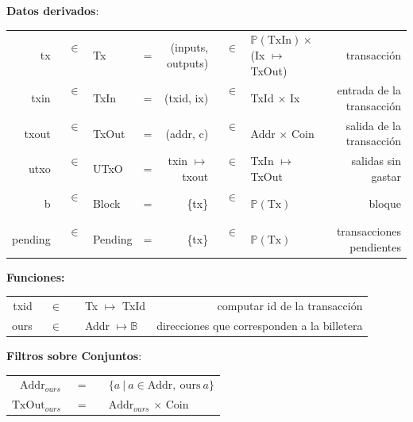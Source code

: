 \documentclass[12pt]{book}
\begin{document}
\textbf{Datos derivados}:

\begin{center}
	\begin{tabular}{ r @{} c @{} l c r @{} c @{} l r}
		tx      & \ $\in$\ \  & Tx      & = & (inputs, outputs)    & \ $\in$\ \  & $\mathbb{P}(\text{TxIn}) \times$ (Ix $\mapsto$ TxOut) & transacción               \\
		txin    & \ $\in$\ \  & TxIn    & = & (txid, ix)           & \ $\in$\ \  & TxId $\times$ Ix                                      & entrada de la transacción \\
		txout   & \ $\in$\ \  & TxOut   & = & (addr, c)            & \ $\in$\ \  & Addr $\times$ Coin                                    & salida de la transacción  \\
		utxo    & \ $\in$\ \  & UTxO    & = & txin $\mapsto$ txout & \ $\in$\ \  & TxIn $\mapsto$ TxOut                                  & salidas sin gastar        \\
        b       & \ $\in$\ \  & Block   & = & \{tx\}                   & \ $\in$\ \  & $\mathbb{P}(\text{Tx})$                               & bloque                    \\
        pending & \ $\in$\ \  & Pending & = & \{tx\}                   & \ $\in$\ \  & $\mathbb{P}(\text{Tx})$                               & transacciones pendientes
	\end{tabular}
\end{center}

\textbf{Funciones:}

\begin{center}
	\begin{tabular}{ r @{} c @{} l r }
		txid & \ $\in$\ \  & Tx $\mapsto$ TxId       & computar id de la transacción               \\
		ours & \ $\in$\ \  & Addr $\mapsto \mathbb{B}$ & direcciones que corresponden a la billetera \\
	\end{tabular}
\end{center}

\textbf{Filtros sobre Conjuntos}:

\begin{center}
	\begin{tabular}{ r @{} c @{} l}
		$\text{Addr}_{ours}$  & \ =\ \  & $\{a\ |\ a \in \text{Addr},\ \text{ours}\ a\}$ \\
		$\text{TxOut}_{ours}$ & \ =\ \  & $\text{Addr}_{ours}$ $\times$ Coin             \\
	\end{tabular}
\end{center}
\end{document}
